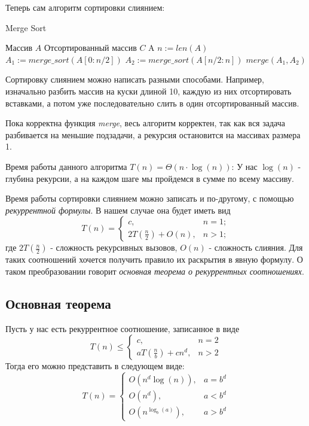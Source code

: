 \documentclass[../book.tex]{subfiles}
\begin{document}
	Теперь сам алгоритм сортировки слиянием:
	\begin{algorithm}[H]
		\caption{Merge Sort}
		\begin{algorithmic}[1]
			\Require Массив $A$
			\Ensure Отсортированный массив $C$
					\State \Return A
				\Else
					\State $n := len(A)$
					\State $A_1 := merge\_sort(A[0: n/2])$
					\State $A_2 := merge\_sort(A[n/2: n])$
					\State \Return $merge(A_1, A_2)$
				\EndIf
		
			\EndFunction
		\end{algorithmic}
	\end{algorithm}
	\begin{remark}
		Сортировку слиянием можно написать разными способами. Например, изначально разбить массив на куски длиной 10, каждую из них отсортировать вставками, а потом уже последовательно слить в один отсортированный массив.
	\end{remark}
	\begin{proof_cor}
		Пока корректна функция \textit{merge}, весь алгоритм корректен, так как вся задача разбивается на меньшие подзадачи, а рекурсия остановится на массивах размера 1.
	\end{proof_cor}
	\begin{time}
		Время работы данного алгоритма $T(n) = \Theta(n\cdot \log(n))$: У нас $\log(n)$ - глубина рекурсии, а на каждом шаге мы пройдемся в сумме по всему массиву. 
		
	\end{time} 
	
	
	Время работы сортировки слиянием можно записать и по-другому, с помощью \textit{рекуррентной формулы}. В нашем случае она будет иметь вид
	\[
	T(n) = 
	\begin{cases}
		c, & n = 1; \\
		2T(\frac{n}{2}) + O(n), & n > 1;
	\end{cases}
	\]
	где $2T(\frac{n}{2})$ - сложность рекурсивных вызовов, $O(n)$ - сложность слияния. Для таких соотношений хочется получить правило их раскрытия в явную формулу. О таком преобразовании говорит \textit{основная теорема о рекуррентных соотношениях}.
	
	\subsection{Основная теорема}
	
	\begin{theorem}
		Пусть у нас есть рекуррентное соотношение, записанное в виде
		\[
		T(n) \leqslant
		\begin{cases}
		c, & n = 2\\
		aT(\frac{n}{b}) + cn^d, & n > 2
		\end{cases}
		\]
		Тогда его можно представить в следующем виде:
		\[
		T(n) = 
		\begin{cases}
		O(n^d \log(n)), & a = b^d \\
		O(n^d), & a < b^d \\
		O(n^{\log_b(a)}), & a > b^d
		\end{cases}
		\]
	\end{theorem}
	
\end{document}
